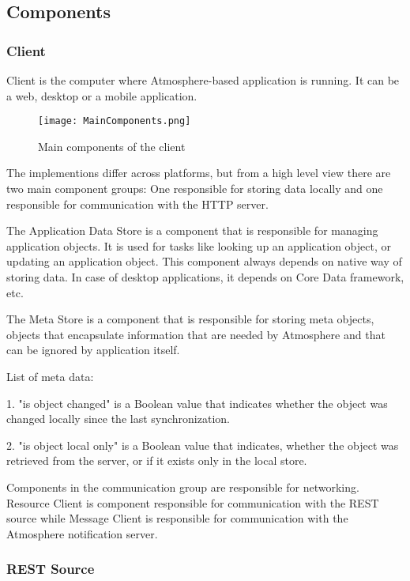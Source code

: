 \subsection{Components}

\subsubsection{Client}

Client is the computer where Atmosphere-based application is running. It can be a web, desktop or a mobile application.

\begin{figure}[ht!]
\centering
\texttt{[image: MainComponents.png]}
\caption{Main components of the client \label{fig:3}}
\end{figure}

The implementions differ across platforms, but from a high level view there are two main component groups: One responsible for storing data locally and one responsible for communication with the HTTP server.

The Application Data Store is a component that is responsible for managing application objects. It is used for tasks like looking up an application object, or updating an application object. This component always depends on native way of storing data. In case of desktop applications, it depends on Core Data framework, etc. 

The Meta Store is a component that is responsible for storing meta objects, objects that encapsulate information that are needed by Atmosphere and that can be ignored by application itself.

List of meta data:

1. "is object changed" is a Boolean value that indicates whether the object was changed locally since the last synchronization. 

2. "is object local only" is a Boolean value that indicates, whether the object was retrieved from the server, or if it exists only in the local store. 

Components in the communication group are responsible for networking. Resource Client is component responsible for communication with the REST source while Message Client is responsible for communication with the Atmosphere notification server. 

\subsubsection{REST Source}

